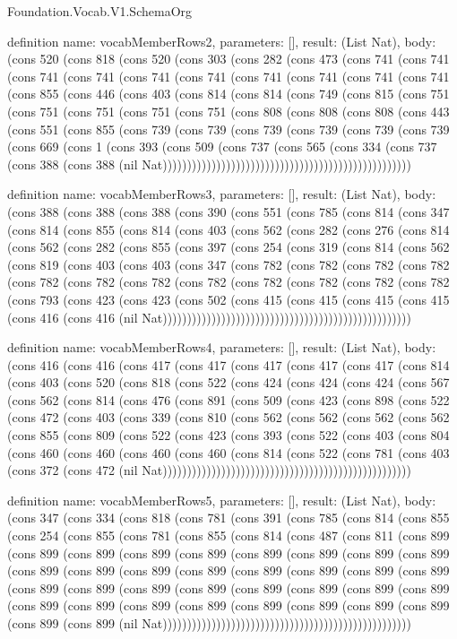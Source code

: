 \begin{lexlean}{Foundation.Vocab.V1.SchemaOrg}
\begin{semanticmodule}
definition{
  name: vocabMemberRows2,
  parameters: [],
  result: (List Nat),
  body: (cons 520 (cons 818 (cons 520 (cons 303 (cons 282 (cons 473 (cons 741 (cons 741 (cons 741 (cons 741 (cons 741 (cons 741 (cons 741 (cons 741 (cons 741 (cons 741 (cons 855 (cons 446 (cons 403 (cons 814 (cons 814 (cons 749 (cons 815 (cons 751 (cons 751 (cons 751 (cons 751 (cons 751 (cons 808 (cons 808 (cons 808 (cons 443 (cons 551 (cons 855 (cons 739 (cons 739 (cons 739 (cons 739 (cons 739 (cons 739 (cons 669 (cons 1 (cons 393 (cons 509 (cons 737 (cons 565 (cons 334 (cons 737 (cons 388 (cons 388 (nil Nat)))))))))))))))))))))))))))))))))))))))))))))))))))
}

definition{
  name: vocabMemberRows3,
  parameters: [],
  result: (List Nat),
  body: (cons 388 (cons 388 (cons 388 (cons 390 (cons 551 (cons 785 (cons 814 (cons 347 (cons 814 (cons 855 (cons 814 (cons 403 (cons 562 (cons 282 (cons 276 (cons 814 (cons 562 (cons 282 (cons 855 (cons 397 (cons 254 (cons 319 (cons 814 (cons 562 (cons 819 (cons 403 (cons 403 (cons 347 (cons 782 (cons 782 (cons 782 (cons 782 (cons 782 (cons 782 (cons 782 (cons 782 (cons 782 (cons 782 (cons 782 (cons 782 (cons 793 (cons 423 (cons 423 (cons 502 (cons 415 (cons 415 (cons 415 (cons 415 (cons 416 (cons 416 (nil Nat)))))))))))))))))))))))))))))))))))))))))))))))))))
}

definition{
  name: vocabMemberRows4,
  parameters: [],
  result: (List Nat),
  body: (cons 416 (cons 416 (cons 417 (cons 417 (cons 417 (cons 417 (cons 417 (cons 814 (cons 403 (cons 520 (cons 818 (cons 522 (cons 424 (cons 424 (cons 424 (cons 567 (cons 562 (cons 814 (cons 476 (cons 891 (cons 509 (cons 423 (cons 898 (cons 522 (cons 472 (cons 403 (cons 339 (cons 810 (cons 562 (cons 562 (cons 562 (cons 562 (cons 855 (cons 809 (cons 522 (cons 423 (cons 393 (cons 522 (cons 403 (cons 804 (cons 460 (cons 460 (cons 460 (cons 460 (cons 814 (cons 522 (cons 781 (cons 403 (cons 372 (cons 472 (nil Nat)))))))))))))))))))))))))))))))))))))))))))))))))))
}

definition{
  name: vocabMemberRows5,
  parameters: [],
  result: (List Nat),
  body: (cons 347 (cons 334 (cons 818 (cons 781 (cons 391 (cons 785 (cons 814 (cons 855 (cons 254 (cons 855 (cons 781 (cons 855 (cons 814 (cons 487 (cons 811 (cons 899 (cons 899 (cons 899 (cons 899 (cons 899 (cons 899 (cons 899 (cons 899 (cons 899 (cons 899 (cons 899 (cons 899 (cons 899 (cons 899 (cons 899 (cons 899 (cons 899 (cons 899 (cons 899 (cons 899 (cons 899 (cons 899 (cons 899 (cons 899 (cons 899 (cons 899 (cons 899 (cons 899 (cons 899 (cons 899 (cons 899 (cons 899 (cons 899 (cons 899 (cons 899 (nil Nat)))))))))))))))))))))))))))))))))))))))))))))))))))
}


\end{semanticmodule}
\end{lexlean}
